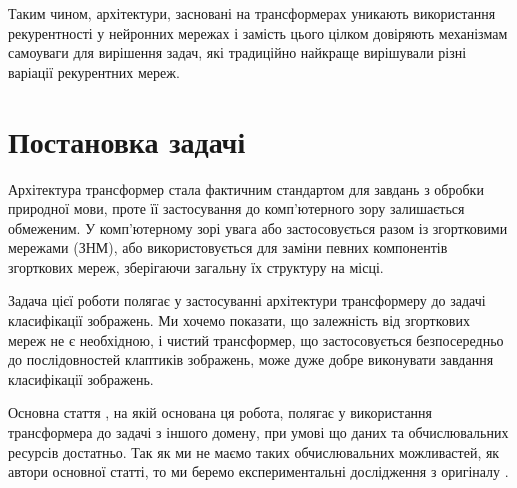 Таким чином, архітектури, засновані на трансформерах
уникають використання рекурентності у нейронних мережах і замість
цього цілком довіряють механізмам самоуваги для
вирішення задач, які традиційно найкраще вирішували
різні варіації рекурентних мереж.

\section{Постановка задачі}
Архітектура трансформер стала фактичним стандартом
для завдань з обробки природної мови, проте її застосування
до комп'ютерного зору залишається обмеженим. У комп'ютерному
зорі увага або застосовується разом із згортковими мережами (ЗНМ),
або використовується для заміни певних компонентів
згорткових мереж, зберігаючи загальну їх структуру на місці.

Задача цієї роботи полягає у застосуванні архітектури
трансформеру до задачі класифікації зображень. Ми хочемо показати,
що залежність від згорткових мереж не є необхідною, і чистий
трансформер, що застосовується безпосередньо до послідовностей
клаптиків зображень, може дуже добре виконувати
завдання класифікації зображень.

Основна стаття \cite{image-worth-16-16-words},
на якій основана ця робота, полягає у використання
трансформера до задачі з іншого домену, при умові що
даних та обчислювальних ресурсів достатньо.
Так як ми не маємо таких обчислювальних
можливастей, як автори основної статті, то ми беремо
експериментальні дослідження з оригіналу \cite{image-worth-16-16-words}.
